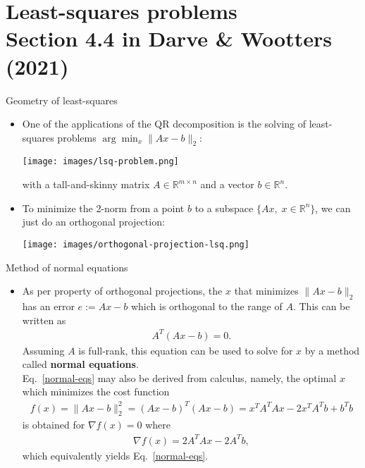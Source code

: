 \documentclass[t,usepdftitle=false]{beamer}
\begin{document}
\section{Least-squares problems\\{\small Section 4.4 in Darve \& Wootters (2021)}}

\begin{frame}{Geometry of least-squares}
\begin{itemize}
\item One of the applications of the QR decomposition is the solving of least-squares problems $\arg\min_x\|Ax-b\|_2$:\vspace{.1cm}
\begin{center}
\texttt{[image: images/lsq-problem.png]}
\end{center}
with a tall-and-skinny matrix $A\in\mathbb{R}^{m\times n}$ and a vector $b\in\mathbb{R}^n$.
\item To minimize the 2-norm from a point $b$ to a subspace $\{Ax,\;x\in\mathbb{R}^n\}$, we can just do an orthogonal projection:
\begin{center}
\texttt{[image: images/orthogonal-projection-lsq.png]}
\end{center}
\end{itemize}
\end{frame}

\begin{frame}{Method of normal equations}
\begin{itemize}
\item As per property of orthogonal projections, the $x$ that minimizes $\|Ax-b\|_2$ has an error $e:=Ax-b$ which is orthogonal to the range of $A$.
This can be written as
\begin{align}\label{normal-eqs}
A^T(Ax-b)=0.
\end{align}
Assuming $A$ is full-rank, this equation can be used to solve for $x$ by a method called \textbf{normal equations}.\vspace{.1cm}\\
Eq.~\eqref{normal-eqs} may also be derived from calculus, namely, the optimal $x$ which minimizes the cost function
\begin{align*}
f(x)=\|Ax-b\|_2^2=(Ax-b)^T(Ax-b)=x^TA^TAx-2x^TA^Tb+b^Tb
\end{align*}
is obtained for $\nabla f(x)=0$ where
\begin{align*}
\nabla f(x)=2A^TAx-2A^Tb,
\end{align*}
which equivalently yields Eq.~\eqref{normal-eqs}.
\end{itemize}
\end{frame}
\end{document}
